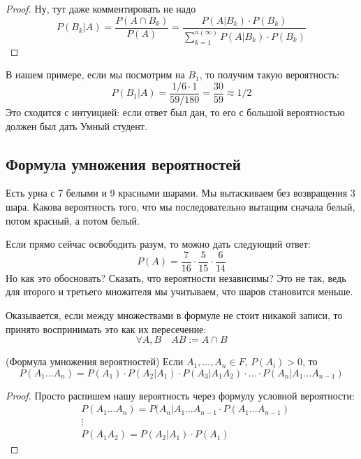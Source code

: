 \begin{proof}
	Ну, тут даже комментировать не надо
	\[
		P(B_k | A) = \frac{P(A \cap B_k)}{P(A)} = \frac{P(A | B_k) \cdot P(B_k)}{\sum_{k = 1}^{n(\infty)} P(A | B_k) \cdot P(B_k)}
	\]
\end{proof}

\begin{example}
	В нашем примере, если мы посмотрим на $B_1$, то получим такую вероятность:
	\[
		P(B_1 | A) = \frac{1 / 6 \cdot 1}{59 / 180} = \frac{30}{59} \approx 1 / 2
	\]
	Это сходится с интуицией: если ответ был дан, то его с большой вероятностью должен был дать Умный студент.
\end{example}

\subsection{Формула умножения вероятностей}

\begin{example}
	Есть урна с 7 белыми и 9 красными шарами. Мы вытаскиваем без возвращения 3 шара. Какова вероятность того, что мы последовательно вытащим сначала белый, потом красный, а потом белый.
	
	Если прямо сейчас освободить разум, то можно дать следующий ответ:
	\[
		P(A) = \frac{7}{16} \cdot \frac{5}{15} \cdot \frac{6}{14}
	\]
	Но как это обосновать? Сказать, что вероятности независимы? Это не так, ведь для второго и третьего множителя мы учитываем, что шаров становится меньше.
\end{example}

\begin{note}
	Оказывается, если между множествами в формуле не стоит никакой записи, то принято воспринимать это как их пересечение:
	\[
		\forall A, B \quad AB := A \cap B
	\]
\end{note}

\begin{theorem} (Формула умножения вероятностей)
	Если $A_1, \ldots, A_n \in F$, $P(A_i) > 0$, то
	\[
		P(A_1 \ldots A_n) = P(A_1) \cdot P(A_2 | A_1) \cdot P(A_3 | A_1A_2) \cdot \ldots \cdot P(A_n | A_1 \ldots A_{n - 1})
	\]
\end{theorem}

\begin{proof}
	Просто распишем нашу вероятность через формулу условной вероятности:
	\begin{align*}
		&{P(A_1 \ldots A_n) = P(A_n | A_1 \ldots A_{n - 1} \cdot P(A_1 \ldots A_{n - 1})}
		\\
		&{\vdots}
		\\
		&{P(A_1 A_2) = P(A_2 | A_1) \cdot P(A_1)}
	\end{align*}
\end{proof}

